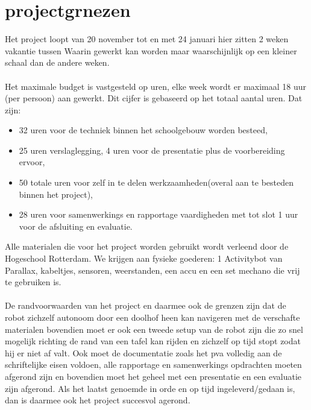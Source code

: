 \documentclass[oneside]{book}
\begin{document}
\clearpage
\chapter{projectgrnezen}
Het project loopt van 20 november tot en met 24 januari hier zitten 2 weken vakantie tussen
Waarin gewerkt kan worden maar waarschijnlijk op een kleiner schaal dan de andere weken.\\
\\
Het maximale budget is vastgesteld op uren, elke week wordt er maximaal 18 uur (per persoon) aan
gewerkt.
Dit cijfer is gebaseerd op het totaal aantal uren.
Dat zijn: 
\begin{itemize}
\item 32 uren voor de techniek binnen het schoolgebouw worden besteed,
\item 25 uren verslaglegging, 4 uren voor de presentatie plus de voorbereiding ervoor,
\item 50 totale uren voor zelf in te delen werkzaamheden(overal aan te besteden binnen het project),
\item 28 uren voor samenwerkings en rapportage vaardigheden met tot slot 1 uur voor de afsluiting en
evaluatie.
\end{itemize}
Alle materialen die voor het project worden gebruikt wordt verleend door de Hogeschool
Rotterdam.
We krijgen aan fysieke goederen: 1 Activitybot van Parallax, kabeltjes, sensoren, weerstanden, een
accu en een set mechano die vrij te gebruiken is.\\
\\
De randvoorwaarden van het project en daarmee ook de grenzen zijn dat de robot zichzelf
autonoom door een doolhof heen kan navigeren met
de verschafte materialen bovendien moet er ook een tweede setup van de robot zijn die zo snel
mogelijk richting de rand van een tafel kan rijden en zichzelf op tijd stopt zodat hij er niet af valt.
Ook moet de documentatie zoals het pva volledig aan de schriftelijke eisen voldoen, alle rapportage
en samenwerkings opdrachten moeten
afgerond zijn en bovendien moet het geheel met een presentatie en een evaluatie zijn afgerond.
Als het laatst genoemde in orde en op tijd ingeleverd/gedaan is, dan is daarmee ook het project
succesvol agerond.
\clearpage
\end{document}
